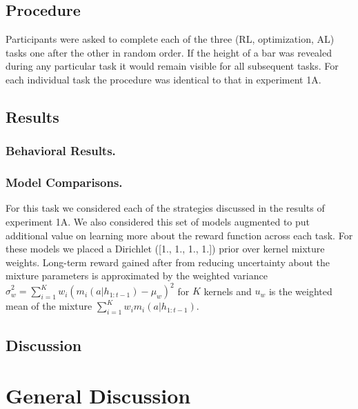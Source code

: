 \documentclass[10pt,letterpaper]{article}
\begin{document}
	\subsection{Procedure}
	
	Participants were asked to complete each of the three (RL, optimization, AL) tasks one after the other in random order. If the height of a bar was revealed during any particular task it would remain visible for all subsequent tasks. For each individual task the procedure was identical to that in experiment 1A.

	\subsection{Results}
	
	\subsubsection{Behavioral Results.}
	
	\subsubsection{Model Comparisons.}
	
	For this task we considered each of the strategies discussed in the results of experiment 1A. We also considered this set of models augmented to put additional value on learning more about the reward function across each task. For these models we placed a Dirichlet ([1., 1., 1., 1.]) prior over kernel mixture weights. Long-term reward gained after from reducing uncertainty about the mixture parameters is approximated by the weighted variance $\hat{\sigma}^{2}_{w} = \sum_{i = 1}^{K} w_{i}(m_{i}(a|h_{1:t-1}) - \mu_{w})^{2}$ for $K$ kernels and $u_{w}$ is the weighted mean of the mixture $\sum_{i=1}^{K} w_{i} m_{i}(a|h_{1:t-1})$.

	
	\subsection{Discussion}
	
	\section{General Discussion}
	
	
	
	\setlength{\bibleftmargin}{.125in}
	\setlength{\bibindent}{-\bibleftmargin}
	
	
		
	
\end{document}
